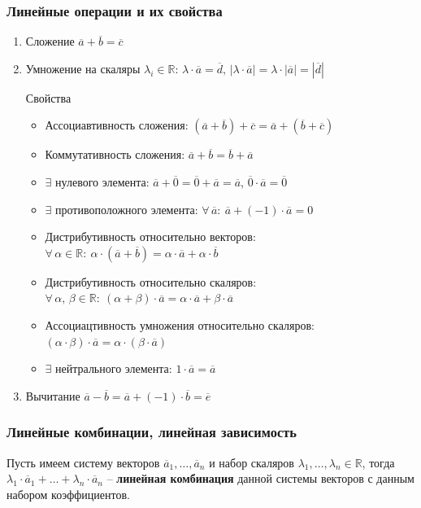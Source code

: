 \documentclass{article}
\newcommand{\R}{\mathbb R}
\begin{document}
\subsubsection{Линейные операции и их свойства}
\begin{enumerate}
    \item Сложение $\overline{a}+\overline{b}=\overline{c}$
    \item Умножение на скаляры $\lambda_i\in\R$: $\lambda\cdot\overline{a}=\overline{d},\,|\lambda\cdot\overline{a}|=\lambda\cdot|\overline{a}|=|\overline{d}|$
    
    Свойства 
    \begin{itemize}
        \item Ассоциавтивность сложения: $(\overline{a}+\overline{b})+\overline{c}=\overline{a}+(\overline{b}+\overline{c})$
        \item Коммутативность сложения: $\overline{a}+\overline{b}=\overline{b}+\overline{a}$
        \item $\exists$ нулевого элемента: $\overline{a}+\overline{0}=\overline{0}+\overline{a}=\overline{a}$, $\overline{0}\cdot\overline{a}=\overline{0}$ 
        \item $\exists$ противоположного элемента: $\forall\,\overline{a}:\:\overline{a}+(-1)\cdot\overline{a}=0$
        \item Дистрибутивность относительно векторов: $\forall\,\alpha\in\R:\:\alpha\cdot(\overline{a}+\overline{b})=\alpha\cdot\overline{a}+\alpha\cdot\overline{b}$
        \item Дистрибутивность относительно скаляров: $\forall\,\alpha,\,\beta\in\R:\:(\alpha+\beta)\cdot\overline{a}=\alpha\cdot\overline{a}+\beta\cdot\overline{a}$
        \item Ассоциацтивность умножения относительно скаляров: $(\alpha\cdot\beta)\cdot\overline{a}=\alpha\cdot(\beta\cdot\overline{a})$
    \item $\exists$ нейтрального элемента:    $1\cdot\overline{a}=\overline{a}$
    \end{itemize}
    \item Вычитание $\overline{a}-\overline{b}=\overline{a}+(-1)\cdot\overline{b}=\overline{e}$

\end{enumerate}
\subsubsection{Линейные комбинации, линейная зависимость}
Пусть имеем систему векторов $\overline{a}_1,\ldots,\overline{a}_n$ и набор скаляров $\lambda_1,\ldots,\lambda_n\in\R$, тогда $\lambda_1\cdot\overline{a}_1+\ldots+\lambda_n\cdot\overline{a}_n$ -- \textbf{линейная комбинация} данной системы векторов с данным набором коэффициентов.
\end{document}
